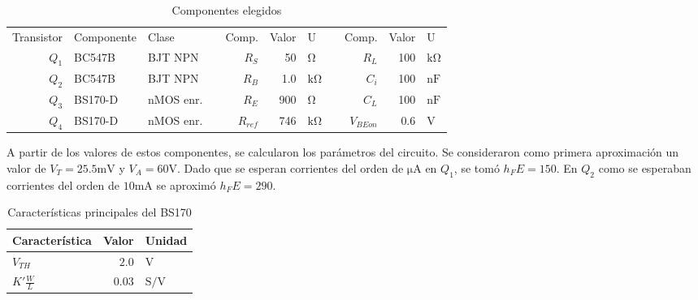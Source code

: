 \begin{table}[ht]
    \centering
    \begin{tabular}{|r|l|l|l|r|r|l|l|r|r|l|}
    \cline{1-3} \cline{5-7} \cline{9-11}
    Transistor & Componente & Clase       &  & Comp.      & Valor & U                &  & Comp. & Valor & U                  \\ \cline{1-3} \cline{5-7} \cline{9-11} 
    $Q_1$      & BC547B     & BJT NPN     &  & $R_S$      & 50   & $\si{\ohm}$ &  & $R_L$      & 100   & $\si{\kilo\ohm}$   \\
    $Q_2$      & BC547B     & BJT NPN     &  & $R_B$      & 1.0   & $\si{\kilo\ohm}$ &  & $C_i$      & 100   & $\si{\nano\farad}$ \\
    $Q_3$      & BS170-D    & nMOS enr.  &  & $R_E$      & 900   & $\si{\ohm}$ &  & $C_L$      & 100   & $\si{\nano\farad}$ \\
    $Q_4$      & BS170-D    & nMOS enr. &  & $R_{ref}$\footnotemark[1]  & 746   & $\si{\kilo\ohm}$ &  &           $V_{BEon}$& 0.6   &   $\si{\volt}$  \\ \cline{1-3} \cline{5-7} \cline{9-11} 
    \end{tabular}
    \caption{Componentes elegidos}
\end{table}

A partir de los valores de estos componentes, se calcularon los parámetros del circuito. Se consideraron como primera aproximación un valor de $V_T = 25.5 \si{\milli\volt}$ y $V_A = 60 \si{\volt}$. Dado que se esperan corrientes del orden de $\si{\micro\ampere}$ en $Q_1$, se tomó $h_FE = 150$. En $Q_2$ como se esperaban corrientes del orden de $10\si{\milli\ampere}$ se aproximó $h_FE = 290$.

\begin{table}[ht!]
    \centering
    \begin{tabular}{|l|r|l|}
        \hline
        Característica  &   Valor   &   Unidad  \\
        \hline
        $V_{TH}$    &   $2.0$   &   $\si{\volt}$    \\
        $K'\frac{W}{L}$\footnotemark[2]&$0.03$  &   $\si{\siemens/\volt}$ \\
        \hline
    \end{tabular}
    \caption{Características principales del BS170}
\end{table}

